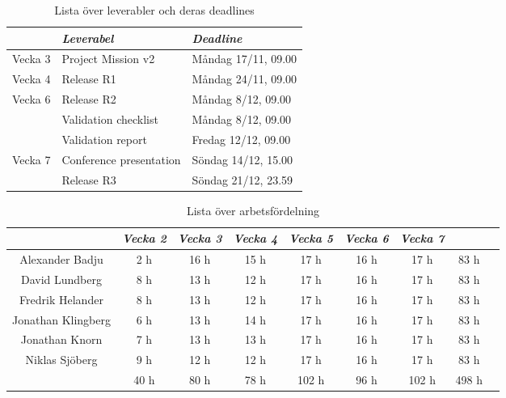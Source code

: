 \documentclass[10pt]{article}
\begin{document}
\begin{table}[htbp] %
  \begin{center}
    \begin{tabular}{l|ll}
      & \emph{Leverabel} & \emph{Deadline} \\ \hline
      Vecka 3      & Project Mission v2        & Måndag 17/11, 09.00 \\
      Vecka 4      & Release R1                & Måndag 24/11, 09.00 \\
      Vecka 6      & Release R2                & Måndag 8/12,  09.00 \\
                    & Validation checklist      & Måndag 8/12, 09.00 \\
                    & Validation report         & Fredag 12/12, 09.00 \\
      Vecka 7      & Conference presentation   & Söndag 14/12, 15.00 \\
                    & Release R3                & Söndag 21/12, 23.59 \\

     \hline 
    \end{tabular}
  \end{center}
  \caption{Lista över leverabler och deras deadlines}
\end{table}

\begin{table}[htbp]
    \begin{center}
        \begin{tabular}{ |c|c|c|c|c|c|c||c|c| }
        \hline
         & \emph{Vecka 2} & \emph{Vecka 3} & \emph{Vecka 4} & \emph{Vecka 5} &              \emph{Vecka 6} & \emph{Vecka 7} & \\
        \hline
        Alexander Badju & 2 h & 16 h & 15 h & 17 h & 16 h & 17 h & 83 h\\
        David Lundberg & 8 h & 13 h & 12 h & 17 h & 16 h & 17 h & 83 h\\
        Fredrik Helander & 8 h & 13 h & 12 h & 17 h & 16 h & 17 h & 83 h\\
        Jonathan Klingberg & 6 h & 13 h & 14 h & 17 h & 16 h & 17 h & 83 h\\
        Jonathan Knorn & 7 h & 13 h & 13 h & 17 h & 16 h & 17 h & 83 h\\
        Niklas Sjöberg & 9 h & 12 h & 12 h & 17 h & 16 h & 17 h & 83 h\\
        \hline
        \hline
         & 40 h & 80 h & 78 h & 102 h & 96 h & 102 h & 498 h\\
        \hline
        \end{tabular}
    \end{center}
    \caption{Lista över arbetsfördelning}
\end{table}
\end{document}
